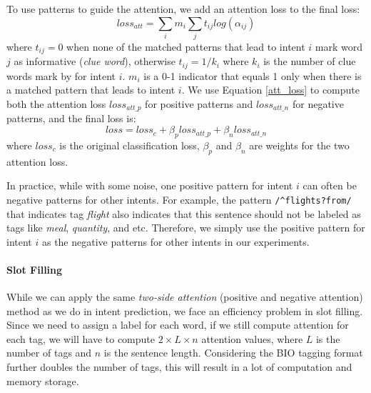 To use \RE patterns to guide the attention, we add an attention loss to the final loss:
\begin{equation}
loss_{att} = \sum_{i}{m_i\sum_{j}{t_{ij}log(\alpha_{ij})}}
\label{att_loss}
\end{equation}
where $t_{ij} = 0$ when none of the matched patterns that lead to intent $i$ mark word $j$ as informative (\emph{clue word}), otherwise $t_{ij} = 1/k_{i}$ where $k_i$ is the number of clue words mark by \RE for intent $i$. $m_i$ is a 0-1 indicator that equals 1 only when there is a matched \RE pattern that leads to intent $i$. We use Equation \ref{att_loss} to compute both the attention loss $loss_{att\_p}$ for positive patterns and $loss_{att\_n}$ for negative patterns, and the final loss is:
\begin{equation}
loss = loss_{c} + \beta_p loss_{att\_p} + \beta_n loss_{att\_n}
\end{equation} 
where $loss_{c}$ is the original classification loss, $\beta_p$ and $\beta_n$ are weights for the two attention loss.

In practice, while with some noise, one positive pattern for intent $i$ can often be negative patterns for other intents. For example, the pattern \texttt{/\textasciicircum flights?\:from/} that indicates tag \emph{flight} also indicates that this sentence should not be labeled as tags like \emph{meal}, \emph{quantity}, and etc.
Therefore, we simply use the positive pattern for intent $i$ as the negative patterns for other intents in our experiments.

\paragraph{Slot Filling}
While we can apply the same \emph{two-side attention} (positive and negative attention) method as we do in intent prediction, we face an efficiency problem in slot filling. Since we need to assign a label for each word, if we still compute attention for each tag, we will have to compute $2\times L \times n$ attention values, where $L$ is the number of tags and $n$ is the sentence length. Considering the BIO tagging format further doubles the number of tags, this will result in a lot of computation and memory storage. 

